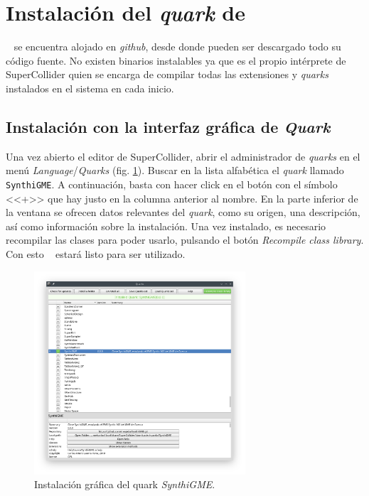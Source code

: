 \section[Instalación del \textit{quark} de \appName]
{Instalación del \textit{quark} de \appName}


\appName~ se encuentra alojado en \textit{github}, desde donde pueden ser descargado todo su código fuente. No existen binarios instalables ya que es el propio intérprete de SuperCollider quien se encarga de compilar todas las extensiones y \textit{quarks} instalados en el sistema en cada inicio.

\subsection{Instalación con la interfaz gráfica de \textit{Quark}}

Una vez abierto el editor de SuperCollider, abrir el administrador de \textit{quarks} en el menú \textit{Language}/\textit{Quarks} (fig. \ref{fig:quark_ide}). Buscar en la lista alfabética el \textit{quark} llamado \texttt{SynthiGME}. A continuación, basta con hacer click en el botón con el símbolo <<+>> que hay justo en la columna anterior al nombre. En la parte inferior de la ventana se ofrecen datos relevantes del \textit{quark}, como su origen, una descripción, así como información sobre la instalación. Una vez instalado, es necesario recompilar las clases para poder usarlo, pulsando el botón \textit{Recompile class library}. Con esto \appName~ estará listo para ser utilizado.

\begin{figure}[H]
	\centering
	\includegraphics[width=0.7\textwidth]{quark_ide}
	\caption[Instalación gráfica del quark \texttt{SynthiGME}]{Instalación gráfica del quark \textit{SynthiGME}.}
	\label{fig:quark_ide}
\end{figure}


